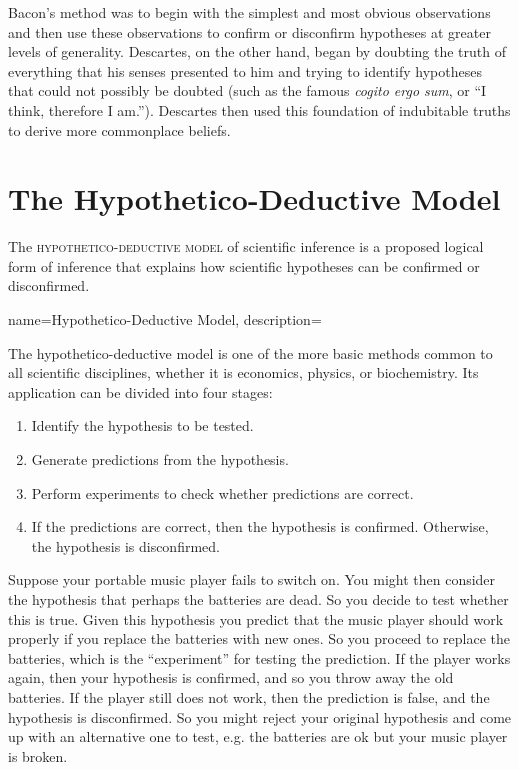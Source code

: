 Bacon's method was to begin with the simplest and most obvious observations and then use these observations to confirm or disconfirm hypotheses at greater levels of generality. Descartes, on the other hand, began by doubting the truth of everything that his senses presented to him and trying to identify hypotheses that could not possibly be doubted (such as the famous \emph{cogito ergo sum}, or ``I think, therefore I am.''). Descartes then used this foundation of indubitable truths to derive more commonplace beliefs.

\section{The Hypothetico-Deductive Model}

The \textsc{\gls{hypothetico-deductive model}} of scientific inference is a proposed logical form of inference that explains how scientific hypotheses can be confirmed or disconfirmed.

{
name=Hypothetico-Deductive Model,
description={}
}

The hypothetico-deductive model is one of the more basic methods common to all scientific disciplines, whether it is economics, physics, or biochemistry. Its application can be divided into four stages:

\begin{enumerate}
\item Identify the hypothesis to be tested.
\item Generate predictions from the hypothesis.
\item Perform experiments to check whether predictions are correct.
\item If the predictions are correct, then the hypothesis is confirmed. Otherwise, the hypothesis is disconfirmed.
\end{enumerate}

Suppose your portable music player fails to switch on. You might then consider the hypothesis that perhaps the batteries are dead. So you decide to test whether this is true. Given this hypothesis you predict that the music player should work properly if you replace the batteries with new ones. So you proceed to replace the batteries, which is the ``experiment'' for testing the prediction. If the player works again, then your hypothesis is confirmed, and so you throw away the old batteries. If the player still does not work, then the prediction is false, and the hypothesis is disconfirmed. So you might reject your original hypothesis and come up with an alternative one to test, e.g. the batteries are ok but your music player is broken.

